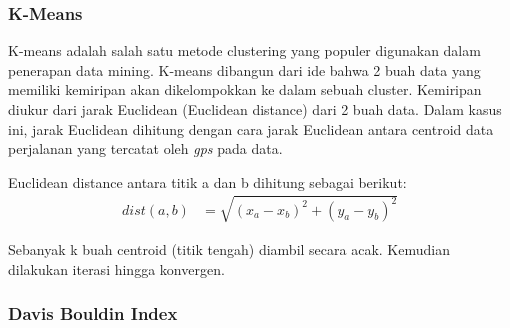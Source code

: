 \documentclass{article}
\begin{document}
\subsubsection{K-Means}
\begin{adjustwidth}{4em}{0pt}

\hspace{\parindent}K-means adalah salah satu metode clustering yang populer digunakan dalam penerapan data mining. K-means dibangun dari ide bahwa 2 buah data yang memiliki kemiripan akan dikelompokkan ke dalam sebuah cluster. Kemiripan diukur dari jarak Euclidean (Euclidean distance) dari 2 buah data. Dalam kasus ini, jarak Euclidean dihitung dengan cara jarak Euclidean antara centroid data perjalanan yang tercatat oleh \textit{gps} pada data.

Euclidean distance antara titik a dan b dihitung sebagai berikut:
\begin{align*}
	dist(a,b) &= \sqrt{(x_{a} - x_{b})^2 + (y_{a} - y_{b})^2}
\end{align*}

Sebanyak k buah centroid (titik tengah) diambil secara acak. Kemudian dilakukan iterasi hingga konvergen. 

\end{adjustwidth}

\subsubsection{Davis Bouldin Index}
\end{document}

